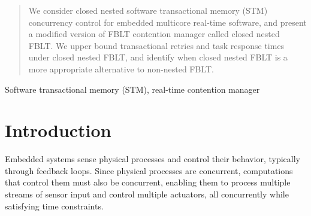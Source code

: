 \documentclass[10pt, conference, compsocconf]{IEEEtran}
\begin{document}
\begin{abstract}
We consider closed nested software transactional memory (STM) concurrency control for embedded multicore real-time software, and present a modified version of FBLT contention manager called closed nested FBLT. We upper bound transactional retries and task response times under closed nested FBLT, and identify when closed nested FBLT is a more appropriate alternative to non-nested FBLT.

\end{abstract}

\begin{IEEEkeywords}
Software transactional memory (STM), real-time contention manager

\end{IEEEkeywords}


%
\IEEEpeerreviewmaketitle



\section{Introduction}
\label{sec:intro}

Embedded systems sense physical processes and control their behavior, typically through feedback loops. Since physical processes are concurrent, computations that control them must also be concurrent, enabling them to process multiple streams of sensor input and control multiple actuators, all concurrently while satisfying time constraints. 
\end{document}
